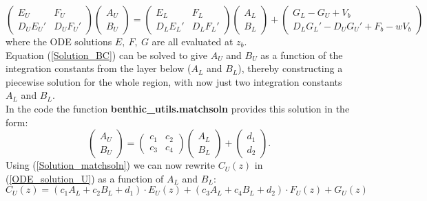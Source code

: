 \documentclass[gmd, manuscript]{copernicus}
\begin{document}
\begin{equation}
 \begin{pmatrix} E_U & F_U \\ D_UE_U' & D_UF_U' \end{pmatrix} \begin{pmatrix} A_U \\ B_U \end{pmatrix} = \begin{pmatrix} E_L & F_L \\ D_LE_L' & D_LF_L' \end{pmatrix} \begin{pmatrix} A_L \\ B_L \end{pmatrix} 
 + \begin{pmatrix} G_L - G_U + V_b \\ D_LG_L' - D_UG_U' + F_b - wV_b\end{pmatrix} \label{Solution_BC}
\end{equation}
where the ODE solutions $E,\ F,\ G$ are all evaluated at $z_b$.\\[1em]
Equation (\ref{Solution_BC}) can be solved to give $A_U$ and $B_U$ as a function of the integration constants from the layer below ($A_L$ and $B_L$), thereby constructing a piecewise solution for the whole region, 
with now just two integration constants $A_L$ and $B_L$. \\[1em]
In the code the function \textsf{\textbf{benthic\_utils.matchsoln}} provides this solution in the form:
\begin{equation}
\begin{pmatrix} A_U \\ B_U \end{pmatrix} = \begin{pmatrix} c_1 & c_2 \\ c_3 & c_4 \end{pmatrix} \begin{pmatrix} A_L \\ B_L \end{pmatrix} + \begin{pmatrix} d_1 \\ d_2 \end{pmatrix} . \label{Solution_matchsoln} 
\end{equation}
Using (\ref{Solution_matchsoln}) we can now rewrite $C_U(z)$ in (\ref{ODE_solution_U}) as a function of $A_L$ and $B_L$:
\begin{equation*}
 C_U(z) = (c_1 A_L + c_2 B_L + d_1) \cdot E_U(z) + (c_3 A_L + c_4 B_L + d_2) \cdot F_U(z) + G_U(z) 
\end{equation*}
\end{document}
